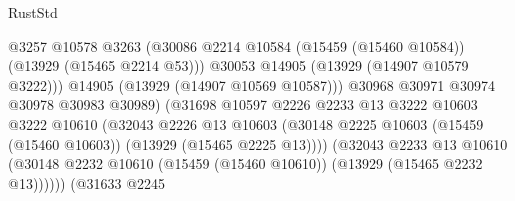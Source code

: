 \begin{lexlean}{RustStd}
\begin{coremodule}
                                              @3257
                                              @10578
                                              @3263
                                              (@30086
                                                @2214
                                                @10584
                                                (@15459 (@15460 @10584))
                                                (@13929 (@15465 @2214 @53)))
                                              @30053
                                              @14905
                                              (@13929 (@14907 @10579 @3222)))
                                            @14905
                                            (@13929 (@14907 @10569 @10587)))
                                          @30968
                                          @30971
                                          @30974
                                          @30978
                                          @30983
                                          @30989)
                                        (@31698
                                          @10597
                                          @2226
                                          @2233
                                          @13
                                          @3222
                                          @10603
                                          @3222
                                          @10610
                                          (@32043
                                            @2226
                                            @13
                                            @10603
                                            (@30148
                                              @2225
                                              @10603
                                              (@15459 (@15460 @10603))
                                              (@13929 (@15465 @2225 @13))))
                                          (@32043
                                            @2233
                                            @13
                                            @10610
                                            (@30148
                                              @2232
                                              @10610
                                              (@15459 (@15460 @10610))
                                              (@13929 (@15465 @2232 @13))))))
                                      (@31633
                                        @2245

\end{coremodule}
\end{lexlean}
